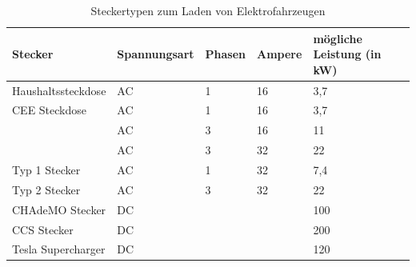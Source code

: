 \begin{table}[bh]
\begin{tabular}{|l|l|l|l|l|}
\hline
Stecker            & Spannungsart & Phasen & Ampere & mögliche Leistung (in kW) \\ \hline \hline
Haushaltssteckdose & AC           & 1      & 16     & 3,7                       \\ \hline
CEE Steckdose      & AC           & 1      & 16     & 3,7                       \\ \cline{2-5} 
                   & AC           & 3      & 16     & 11                        \\ \cline{2-5} 
                   & AC           & 3      & 32     & 22                        \\ \hline
Typ 1 Stecker      & AC           & 1      & 32     & 7,4                       \\ \hline
Typ 2 Stecker      & AC           & 3      & 32     & 22                        \\ \hline
CHAdeMO Stecker    & DC           &        &        & 100                       \\ \hline
CCS Stecker        & DC           &        &        & 200                       \\ \hline
Tesla Supercharger & DC           &        &        & 120                       \\ \hline
\end{tabular}
\caption{Steckertypen zum Laden von Elektrofahrzeugen}
\label{tab:table1}
\end{table}



